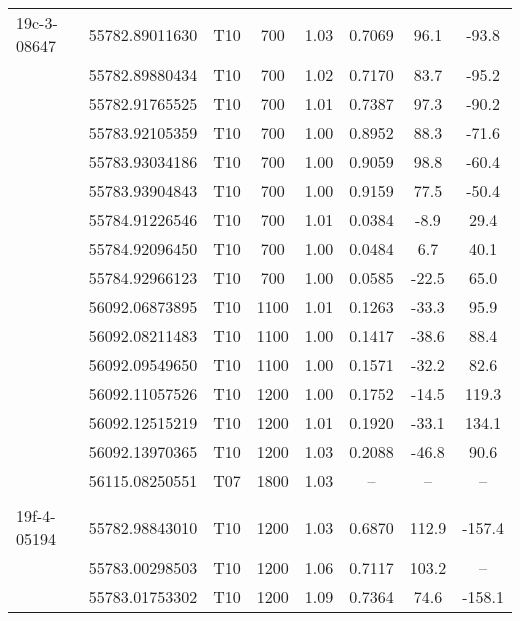 \documentclass[fleqn,usenatbib]{mnras}
\begin{document}
\begin{center}
\begin{longtable}{lccccccc}
\\  [-2ex]
19c-3-08647	& 55782.89011630 & T10 & 700  & 1.03  & 0.7069 & 96.1 & -93.8 \\ %
			& 55782.89880434 & T10 & 700  & 1.02  & 0.7170 & 83.7 & -95.2 \\ %
			& 55782.91765525 & T10 & 700  & 1.01  & 0.7387 & 97.3 & -90.2 \\ %
			& 55783.92105359 & T10 & 700  & 1.00  & 0.8952 & 88.3 & -71.6 \\ %
			& 55783.93034186 & T10 & 700  & 1.00  & 0.9059 & 98.8 & -60.4 \\ %
			& 55783.93904843 & T10 & 700  & 1.00  & 0.9159 & 77.5 & -50.4 \\ %
			& 55784.91226546 & T10 & 700  & 1.01  & 0.0384 & -8.9 & 29.4 \\ %
			& 55784.92096450 & T10 & 700  & 1.00  & 0.0484 & 6.7 & 40.1 \\ %
			& 55784.92966123 & T10 & 700  & 1.00  & 0.0585 & -22.5 & 65.0 \\ %
			& 56092.06873895 & T10 & 1100  & 1.01  & 0.1263 & -33.3 & 95.9 \\ %
			& 56092.08211483 & T10 & 1100  & 1.00  & 0.1417 & -38.6 & 88.4 \\ %
			& 56092.09549650 & T10 & 1100  & 1.00  & 0.1571 & -32.2 & 82.6 \\ %
			& 56092.11057526 & T10 & 1200  & 1.00  & 0.1752 & -14.5 & 119.3 \\ %
			& 56092.12515219 & T10 & 1200  & 1.01  & 0.1920 & -33.1 & 134.1 \\ %
			& 56092.13970365 & T10 & 1200  & 1.03  & 0.2088 & -46.8  & 90.6\\ %
			& 56115.08250551 & T07 & 1800  & 1.03  & -- & -- & -- \\ %
\\  [-2ex]
19f-4-05194	& 55782.98843010 & T10 & 1200  & 1.03  & 0.6870 & 112.9 & -157.4 \\ %
			& 55783.00298503 & T10 & 1200  & 1.06  & 0.7117 & 103.2 & -- \\ %
			& 55783.01753302 & T10 & 1200  & 1.09  & 0.7364 & 74.6 & -158.1 \\ %

\end{longtable}
\end{center}
\end{document}

